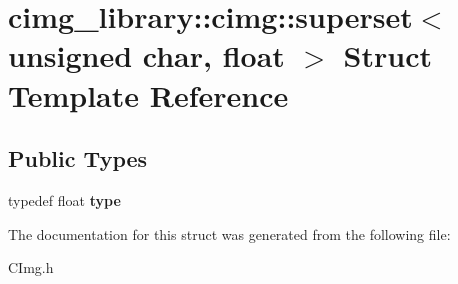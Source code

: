 \hypertarget{structcimg__library_1_1cimg_1_1superset_3_01unsigned_01char_00_01float_01_4}{\section{cimg\-\_\-library\-:\-:cimg\-:\-:superset$<$ unsigned char, float $>$ Struct Template Reference}
\label{structcimg__library_1_1cimg_1_1superset_3_01unsigned_01char_00_01float_01_4}
}
\subsection*{Public Types}
\begin{DoxyCompactItemize}
\item 
\hypertarget{structcimg__library_1_1cimg_1_1superset_3_01unsigned_01char_00_01float_01_4_a7bae324e5a75eea535236aae2fff59fb}{typedef float {\bfseries type}}\label{structcimg__library_1_1cimg_1_1superset_3_01unsigned_01char_00_01float_01_4_a7bae324e5a75eea535236aae2fff59fb}

\end{DoxyCompactItemize}


The documentation for this struct was generated from the following file\-:\begin{DoxyCompactItemize}
\item 
C\-Img.\-h\end{DoxyCompactItemize}

